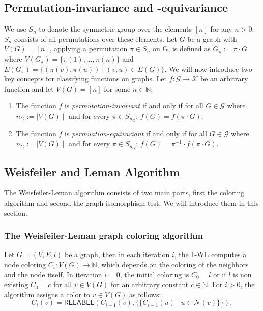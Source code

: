 \documentclass[11pt, dvipsnames, DIV=12]{scrreprt}
\theoremstyle{definition}
\newcommand{\MSopen}{\{\!\!\{}
\newcommand{\MSclose}{\}\!\!\}}
\begin{document}
\subsection{Permutation-invariance and -equivariance}
We use $S_n$ to denote the symmetric group over the elements $[n]$ for any $n > 0$. $S_n$ consists of all permutations over these elements. Let $G$ be a graph with $V(G) = [n]$, applying a permutation $\pi \in S_n$ on G, is defined as $G_\pi := \pi \cdot G$ where $V(G_\pi) = \{\pi(1), \ldots, \pi(n) \}$ and $E(G_\pi) = \{ (\pi(v), \pi(u)) \mid (v,u) \in E(G)\}$. We will now introduce two key concepts for classifying functions on graphs. Let $f: \mathcal{G} \rightarrow \mathcal{X}$ be an arbitrary function and let $V(G) = [n]$ for some $n \in \mathbb{N}$:\\
\begin{enumerate}
    \item The function $f$ is \textit{permutation-invariant} if and only if for all $G \in \mathcal{G}$ where $n_G := \mid V(G) \mid$ and for every $\pi \in S_{n_G}$: $f(G) = f(\pi \cdot G)$.
    \item The function $f$ is \textit{permuation-equivariant} if and only if for all $G \in \mathcal{G}$ where $n_G := \mid V(G) \mid$ and for every $\pi \in S_{n_G}$: $f(G) = \pi^{-1} \cdot f(\pi \cdot G)$.
\end{enumerate}


\subsection{Weisfeiler and Leman Algorithm}\label{sec:1-WL Definition}
The Weisfeiler-Leman algorithm consists of two main parts, first the coloring algorithm and second the graph isomorphism test. We will introduce them in this section.

\subsubsection{The Weisfeiler-Leman graph coloring algorithm}
Let $G = (V, E, l)$ be a graph, then in each iteration $i$, the 1-WL computes a node coloring $C_i: V(G) \rightarrow \mathbb{N}$, which depends on the coloring of the neighbors and the node itself. In iteration $i=0$, the initial coloring is $C_0 = l$ or if $l$ is non existing $C_0 = c$ for all $v \in V(G)$ for an arbitrary constant $c \in \mathbb{N}$. For $i > 0$, the algorithm assigns a color to $v \in V(G)$ as follows:
\begin{equation*}
C_i (v) = \textsf{RELABEL}(C_{i-1}(v), \MSopen C_{i-1}(u) \mid u \in \mathcal{N}(v) \MSclose),
\end{equation*}
\end{document}
